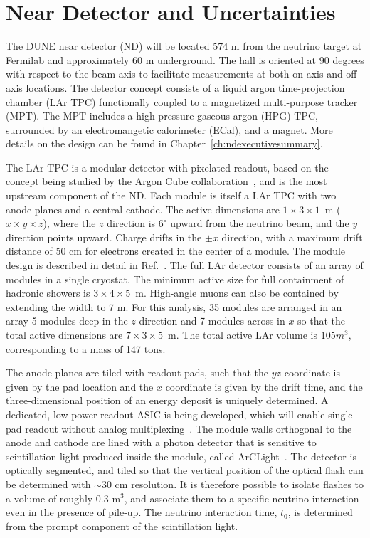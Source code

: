 \section{Near Detector and Uncertainties}\label{sec:nu-osc-12}\label{sec:physics-lbnosc-ND-app}

The DUNE near detector (ND) will be located 574 m from the neutrino target at Fermilab and approximately 60 m underground. The hall is oriented at 90 degrees with respect to the beam axis to facilitate measurements at both on-axis and off-axis locations. The detector concept consists of a liquid argon time-projection chamber (LAr TPC) functionally coupled to a magnetized multi-purpose tracker (MPT). The MPT includes a high-pressure gaseous argon (HPG) TPC, surrounded by an electromangetic calorimeter (ECal), and a magnet. More details on the design can be found in Chapter~\ref{ch:ndexecutivesummary}.

The LAr TPC is a modular detector with pixelated readout, based on the concept being studied by the Argon Cube collaboration~\cite{ArgonCube}, and is the most upstream component of the ND. Each module is itself a LAr TPC with two anode planes and a central cathode. The active dimensions are $1 \times 3 \times 1$~m ($x \times y \times z$), where the $z$ direction is $6^{\circ}$ upward from the neutrino beam, and the $y$ direction points upward. Charge drifts in the $\pm x$ direction, with a maximum drift distance of 50 cm for electrons created in the center of a module. The module design is described in detail in Ref.~\cite{ArgonCube}. The full LAr detector consists of an array of modules in a single cryostat. The minimum active size for full containment of hadronic showers is $3 \times 4 \times 5$~m. High-angle muons can also be contained by extending the width to 7 m. For this analysis, 35 modules are arranged in an array 5 modules deep in the $z$ direction and 7 modules across in $x$ so that the total active dimensions are $7 \times 3 \times 5$~m. The total active LAr volume is $105 m^{3}$, corresponding to a mass of 147 tons.

The anode planes are tiled with readout pads, such that the $yz$ coordinate is given by the pad location and the $x$ coordinate is given by the drift time, and the three-dimensional position of an energy deposit is uniquely determined. A dedicated, low-power readout ASIC is being developed, which will enable single-pad readout without analog multiplexing~\cite{LArPix}. The module walls orthogonal to the anode and cathode are lined with a photon detector that is sensitive to scintillation light produced inside the module, called ArCLight~\cite{ArCLight}. The detector is optically segmented, and tiled so that the vertical position of the optical flash can be determined with $\sim$30 cm resolution. It is therefore possible to isolate flashes to a volume of roughly 0.3 m$^{3}$, and associate them to a specific neutrino interaction even in the presence of pile-up. The neutrino interaction time, $t_{0}$, is determined from the prompt component of the scintillation light.


